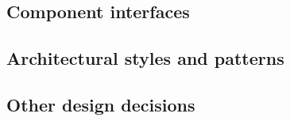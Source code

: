 \subsection{Component interfaces}

\subsection{Architectural styles and patterns}

\subsection{Other design decisions}

